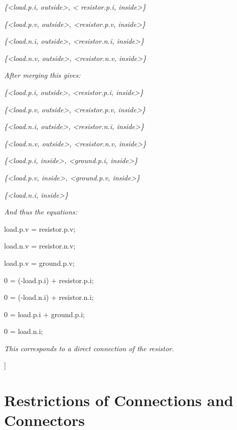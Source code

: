 \documentclass[10pt,a4paper]{report}
\def\doublelabel#1{\label{#1}\hypertarget{#1}{}}
\begin{document}
\emph{\{\textless{}load.p.i, outside\textgreater{}, \textless{}
resistor.p.i, inside\textgreater{}\}}

\emph{\{\textless{}load.p.v, outside\textgreater{},
\textless{}resistor.p.v, inside\textgreater{}\}}

\emph{\{\textless{}load.n.i, outside\textgreater{},
\textless{}resistor.n.i, inside\textgreater{}\}}

\emph{\{\textless{}load.n.v, outside\textgreater{},
\textless{}resistor.n.v, inside\textgreater{}\}}

\emph{After merging this gives:}

\emph{\{\textless{}load.p.i, outside\textgreater{},
\textless{}resistor.p.i, inside\textgreater{}\}}

\emph{\{\textless{}load.p.v, outside\textgreater{},
\textless{}resistor.p.v, inside\textgreater{}\}}

\emph{\{\textless{}load.n.i, outside\textgreater{},
\textless{}resistor.n.i, inside\textgreater{}\}}

\emph{\{\textless{}load.n.v, outside\textgreater{},
\textless{}resistor.n.v, inside\textgreater{}\}}

\emph{\{\textless{}load.p.i, inside\textgreater{},
\textless{}ground.p.i, inside\textgreater{}\}}

\emph{\{\textless{}load.p.v, inside\textgreater{},
\textless{}ground.p.v, inside\textgreater{}\}}

\emph{\{\textless{}load.n.i, inside\textgreater{}\}}

\emph{And thus the equations:}

load.p.v = resistor.p.v;

load.n.v = resistor.n.v;

load.p.v = ground.p.v;

0 = (-load.p.i) + resistor.p.i;

0 = (-load.n.i) + resistor.n.i;

0 = load.p.i + ground.p.i;

0 = load.n.i;

\emph{This corresponds to a direct connection of the resistor.}

{]}

\section{Restrictions of Connections and Connectors}\doublelabel{restrictions-of-connections-and-connectors}
\end{document}

